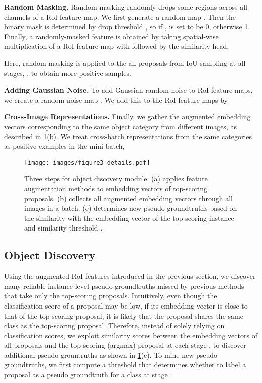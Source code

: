\documentclass[runningheads]{llncs}
\begin{document}
\noindent\textbf{Random Masking.}
Random masking randomly drops some regions across all channels of a RoI feature map.
We first generate a random map .
Then the binary mask  is determined by drop threshold , so if ,  is set to be 0, otherwise 1.
Finally, a randomly-masked feature is obtained by taking spatial-wise multiplication of a RoI feature map  with  followed by the similarity head,

Here, random masking is applied to the all proposals from IoU sampling at all stages, , to obtain more positive samples.

\noindent\textbf{Adding Gaussian Noise.}
To add Gaussian random noise to RoI feature maps, we create a random noise map .
We add this to the RoI feature maps  by




\noindent\textbf{Cross-Image Representations.}
Finally, we gather the augmented embedding vectors corresponding to the same object category from different images, as described in \cref{fig:figure3_details}(b).
We treat cross-batch representations from the same categories as positive examples in the mini-batch,



\begin{figure}[t!]
\centering
\texttt{[image: images/figure3\_details.pdf]}
\caption{Three steps for object discovery module.
(a) applies feature augmentation methods to embedding vectors of top-scoring proposals.
(b) collects all augmented embedding vectors through all images in a batch.
(c) determines new pseudo groundtruths based on the similarity with the embedding vector of the top-scoring instance  and similarity threshold .}
\label{fig:figure3_details}
\end{figure}

\subsection{Object Discovery}
Using the augmented RoI features introduced in the previous section, we discover many reliable instance-level pseudo groundtruths missed by previous methods that take only the top-scoring proposals.
Intuitively, even though the classification score of a proposal may be low, if its embedding vector is close to that of the top-scoring proposal, it is likely that the proposal shares the same class as the top-scoring proposal.
Therefore, instead of solely relying on classification scores, we exploit similarity scores between the embedding vectors of all proposals and the top-scoring (argmax) proposal at each stage , to discover additional pseudo grountruths as shown in \cref{fig:figure3_details}(c).
To mine new pseudo groundtruths, we first compute a threshold  that determines whether to label a proposal as a pseudo groundtruth for a class  at stage :
\end{document}
